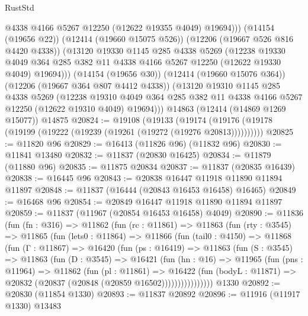 \begin{lexlean}{RustStd}
\begin{coremodule}
              @4338
              @4166
              @5267
              @12250
              (@12622 @19355 @4049)
              @19694)))
        (@14154 (@19656 @22))
        (@12414 (@19660 @15075 @526))
        (@12206 (@19667 @526 @816 @4420 @4338))
        (@13120
          @19330
          @1145
          @285
          @4338
          @5269
          (@12238
            @19330
            @4049
            @364
            @285
            @382
            @11
            @4338
            @4166
            @5267
            @12250
            (@12622 @19330 @4049)
            @19694)))
      (@14154 (@19656 @30))
      (@12414 (@19660 @15076 @364))
      (@12206 (@19667 @364 @807 @4412 @4338))
      (@13120
        @19310
        @1145
        @285
        @4338
        @5269
        (@12238
          @19310
          @4049
          @364
          @285
          @382
          @11
          @4338
          @4166
          @5267
          @12250
          (@12622 @19310 @4049)
          @19694)))
    @14863
    (@12414 (@14869 @1269 @15077))
    @14875
@20824 := @19108
    (@19133 (@19174 (@19176 (@19178 (@19199 (@19222 (@19239 (@19261 (@19272 (@19276 @20813))))))))))
@20825 := @11820 @96
@20829 := @16413 (@11826 @96) (@11832 @96)
@20830 := @11841 @13480
@20832 := @11837 (@20830 @16425)
@20834 := @11879 (@11880 @96)
@20835 := @11875 @20834
@20837 := @11837 (@20835 @16439)
@20838 := @16445 @96
@20843 := @20838 @16447 @11918 @11890 @11894 @11897
@20848 := @11837 (@16444 (@20843 @16453 @16458) @16465)
@20849 := @16468 @96
@20854 := @20849 @16447 @11918 @11890 @11894 @11897
@20859 := @11837 (@11967 (@20854 @16453 @16458) @4049)
@20890 := @11836
    (fun (fn : @316) =>
    @11862
      (fun (rc : @11861) =>
      @11863
        (fun (rty : @3545) =>
        @11865
          (fun (lets0 : @11864) =>
          @11866
            (fun (tail0 : @4150) =>
            @11868
              (fun (Γ : @11867) =>
              @16420
                (fun (ps : @16419) =>
                @11863
                  (fun (S : @3545) =>
                  @11863
                    (fun (D : @3545) =>
                    @16421
                      (fun (hn : @16) =>
                      @11965
                        (fun (pns : @11964) =>
                        @11862
                          (fun (pl : @11861) =>
                          @16422
                            (fun (bodyL : @11871) =>
                            @20832 (@20837 (@20848 (@20859 @16502))))))))))))))))
    @1330
@20892 := @20830 (@11854 @1330)
@20893 := @11837 @20892
@20896 := @11916 (@11917 @1330) @13483

\end{coremodule}
\end{lexlean}
